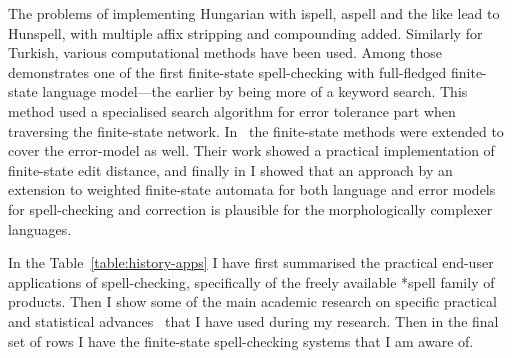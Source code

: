 \documentclass[officiallayout]{unihelcompling}
\begin{document}
The problems of implementing Hungarian with ispell, aspell and the like lead to
Hunspell, with multiple affix stripping and compounding added. Similarly for
Turkish, various computational methods have been used. Among
those~\citet{oflazer1996errortolerant} demonstrates one of the first
finite-state spell-checking with full-fledged finite-state language model---the
earlier by \citep{aho1975efficient} being more of a keyword search. This method
used a specialised search algorithm for error tolerance part when traversing
the finite-state network.  In~\citet{agata2002typographical} the finite-state
methods were extended to cover the error-model as well. Their work showed a
practical implementation of finite-state edit distance, and finally in
 I showed that an approach by an extension
to weighted finite-state automata for both language and error models for
spell-checking and correction is plausible for the morphologically complexer
languages.


In the Table~\ref{table:history-apps} I have first summarised the practical
end-user applications of spell-checking, specifically of the freely available
*spell family of products. Then I show some of  the main academic research
on specific practical and statistical advances~\cite{al2006learning} that I
have used during my research. Then in the final set of rows I have the
finite-state spell-checking systems that I am aware of.
\end{document}
